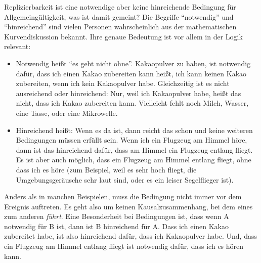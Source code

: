 \documentclass[
  letterpaper,
  DIV=11,
  numbers=noendperiod]{scrreprt}
\begin{document}
\begin{tcolorbox}[enhanced jigsaw, title=\textcolor{quarto-callout-tip-color}{\faLightbulb}\hspace{0.5em}{Notwendige und hinreichende Bedingung}, colbacktitle=quarto-callout-tip-color!10!white, rightrule=.15mm, titlerule=0mm, left=2mm, bottomrule=.15mm, arc=.35mm, leftrule=.75mm, toprule=.15mm, opacityback=0, breakable, bottomtitle=1mm, colframe=quarto-callout-tip-color-frame, toptitle=1mm, opacitybacktitle=0.6, coltitle=black, colback=white]

Replizierbarkeit ist eine notwendige aber keine hinreichende Bedingung
für Allgemeingültigkeit, was ist damit gemeint? Die Begriffe
``notwendig'' und ``hinreichend'' sind vielen Personen wahrscheinlich
aus der mathematischen Kurvendiskussion bekannt. Ihre genaue Bedeutung
ist vor allem in der Logik relevant:

\begin{itemize}
\item
  Notwendig heißt ``es geht nicht ohne''. Kakaopulver zu haben, ist
  notwendig dafür, dass ich einen Kakao zubereiten kann heißt, ich kann
  keinen Kakao zubereiten, wenn ich kein Kakaopulver habe. Gleichzeitig
  ist es nicht ausreichend oder hinreichend: Nur, weil ich Kakaopulver
  habe, heißt das nicht, dass ich Kakao zubereiten kann. Vielleicht
  fehlt noch Milch, Wasser, eine Tasse, oder eine Mikrowelle.
\item
  Hinreichend heißt: Wenn es da ist, dann reicht das schon und keine
  weiteren Bedingungen müssen erfüllt sein. Wenn ich ein Flugzeug am
  Himmel höre, dann ist das hinreichend dafür, dass am Himmel ein
  Flugzeug entlang fliegt. Es ist aber auch möglich, dass ein Flugzeug
  am Himmel entlang fliegt, ohne dass ich es höre (zum Beispiel, weil es
  sehr hoch fliegt, die Umgebungsgeräusche sehr laut sind, oder es ein
  leiser Segelflieger ist).
\end{itemize}

Anders als in manchen Beispielen, muss die Bedingung nicht immer vor dem
Ereignis auftreten. Es geht also um keinen Kausalzusammenhang, bei dem
eines zum anderen \emph{führt}. Eine Besonderheit bei Bedingungen ist,
dass wenn A notwendig für B ist, dann ist B hinreichend für A. Dass ich
einen Kakao zubereitet habe, ist also hinreichend dafür, dass ich
Kakaopulver habe. Und, dass ein Flugzeug am Himmel entlang fliegt ist
notwendig dafür, dass ich es hören kann.

\end{tcolorbox}
\end{document}
